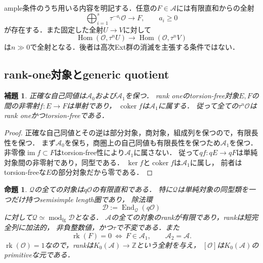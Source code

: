 \documentclass[11pt,a4paper]{ltjsarticle}
\newtheorem{proposition}[theorem]{命題}
\newtheorem{lemma}[theorem]{補題}
\theoremstyle{definition}
\newcommand{\OO}{\mathcal O}
\renewcommand{\AA}{\mathcal A}
\newcommand{\Hom}{\operatorname{Hom}}
\newcommand{\End}{\operatorname{End}}
\newcommand{\rk}{\operatorname{rk}}
\begin{document}
ample条件のうち用いる内容を明記する．任意の$F\in\AA$には有限直和からの全射
\begin{equation}\label{eq:rank-az-generation}
 \bigoplus_{i=1}^{s}\tau^{-a_i}\OO\longrightarrow F,
 \qquad a_i\geq0
\end{equation}
が存在する．また固定した全射$U\to V$に対して
\begin{equation}\label{eq:rank-az-surjectivity}
 \Hom(\OO,\tau^nU)\longrightarrow\Hom(\OO,\tau^nV)
\end{equation}
は$n\gg0$で全射となる．後者は高次Ext群の消滅を主張する条件ではない．

\subsection{rank-one対象とgeneric quotient}

\begin{lemma}\label{lem:rank-one-monomorphism}
正確な自己同値は$\AA_0$および$\AA_1$を保つ．
rank oneのtorsion-free対象$E,F$の間の非零射$f:E\to F$は単射であり，
$\operatorname{coker}f$は$\AA_1$に属する．
従って全ての$\tau^n\OO$はrank oneかつtorsion-freeである．
\end{lemma}

\begin{proof}
正確な自己同値とその逆は部分対象，商対象，組成列を保つので，有限長性を保つ．
まず$\AA_0$を保ち，商圏上の自己同値も有限長性を保つため$\AA_1$を保つ．
非零像$\operatorname{im}f\subset F$はtorsion-free性により$\AA_1$に属さない．
従って$qf:qE\to qF$は単純対象間の非零射であり，同型である．
$\ker f$と$\operatorname{coker}f$は$\AA_1$に属し，
前者はtorsion-freeな$E$の部分対象だから零である．
\end{proof}

\begin{proposition}\label{prop:generic-semisimple}
$\mathcal Q$の全ての対象は$q\OO$の有限直和である．
特に$\mathcal Q$は単純対象の同型類を一つだけ持つsemisimple length圏であり，
除法環
\[
 \mathcal D:=\End_{\mathcal Q}(q\OO)
\]
に対して$\mathcal Q\simeq\operatorname{mod}_{\mathrm{fg}}\mathcal D$となる．
$\AA$の全ての対象のrankが有限であり，rankは短完全列に加法的，
非負整数値，かつ$\tau$で不変である．また
\[
 \rk(F)=0\ \Longleftrightarrow\ F\in\AA_1,
 \qquad \AA_2=\AA.
\]
$\rk(\OO)=1$なので，rankは$K_0(\AA)\to\mathbb Z$という全射を与え，
$[\OO]$は$K_0(\AA)$のprimitiveな元である．
\end{proposition}
\end{document}
